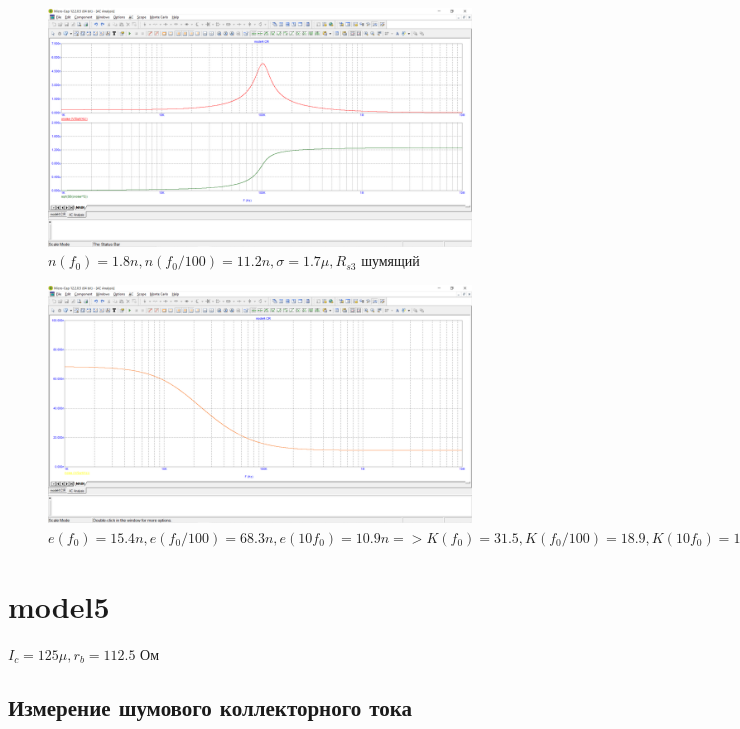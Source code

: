 \documentclass[a4paper, 12pt]{article}%
\begin{document}
\begin{figure}[h!]
    \centering
    \includegraphics[scale = 0.4 \textwidth]{images/mod4_3_2_3.png}
    \caption{$n(f_0) = 1.8n, n(f_0/100) = 11.2n, \sigma = 1.7\mu, R_{s3}$ шумящий}
    \label{fig:m4322}
\end{figure}

\begin{figure}[h!]
    \centering
    \includegraphics[scale = 0.4 \textwidth]{images/mod4_3_3.png}
    \caption{$e(f_0) = 15.4n, e(f_0/100) = 68.3n, e(10 f_0) = 10.9n => K(f_0) = 31.5, K(f_0/100) = 18.9, K(10 f_0) = 15.8$}
    \label{fig:m433}
\end{figure}
\FloatBarrier
\section{\textbf{model5}}
\FloatBarrier
$I_c = 125\mu, r_b = 112.5$ Ом

\subsection{Измерение шумового коллекторного тока}
\FloatBarrier
\end{document}
